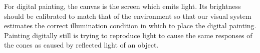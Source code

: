 \documentclass{amsart}
\begin{document}
For digital painting, the canvas is the screen which emits light. Its brightness should be calibrated to match that of the environment so that our visual system estimates the correct illumination condition in which to place the digital painting.  Painting digitally still is trying to reproduce light   to cause the same responses of the cones as caused by reflected light of an object. 

\end{document}
